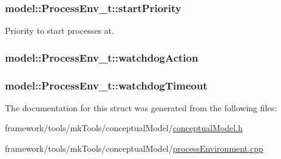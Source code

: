 \subsubsection[{\texorpdfstring{start\+Priority}{startPriority}}]{ model\+::\+Process\+Env\+\_\+t\+::start\+Priority\hspace{0.3cm}{\ttfamily [private]}}\hypertarget{structmodel_1_1_process_env__t_a05c389421f1f8fae761ef38aa17415d4}{}\label{structmodel_1_1_process_env__t_a05c389421f1f8fae761ef38aa17415d4}


Priority to start processes at. 

\subsubsection[{\texorpdfstring{watchdog\+Action}{watchdogAction}}]{ model\+::\+Process\+Env\+\_\+t\+::watchdog\+Action}\hypertarget{structmodel_1_1_process_env__t_a35f1bc1b58313ef7fdf17ab2414e5105}{}\label{structmodel_1_1_process_env__t_a35f1bc1b58313ef7fdf17ab2414e5105}
\subsubsection[{\texorpdfstring{watchdog\+Timeout}{watchdogTimeout}}]{ model\+::\+Process\+Env\+\_\+t\+::watchdog\+Timeout}\hypertarget{structmodel_1_1_process_env__t_a84281b46dd841b2f32614de07423b45c}{}\label{structmodel_1_1_process_env__t_a84281b46dd841b2f32614de07423b45c}


The documentation for this struct was generated from the following files\+:\begin{DoxyCompactItemize}
\item 
framework/tools/mk\+Tools/conceptual\+Model/\hyperlink{conceptual_model_8h}{conceptual\+Model.\+h}\item 
framework/tools/mk\+Tools/conceptual\+Model/\hyperlink{process_environment_8cpp}{process\+Environment.\+cpp}\end{DoxyCompactItemize}
